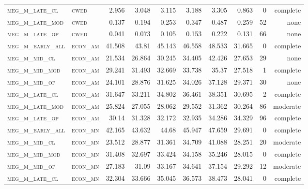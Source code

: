 \begin{landscape}
\begin{center}
\begin{footnotesize}
\begin{longtable}{llrrrrr|rrr}
\textsc{meg\_m\_late\_cl  } & \textsc{cwed      }   & 2.956    & 3.048    & 3.115    & 3.188    & 3.305    & 0.863    & 0   & complete \\
\textsc{meg\_m\_late\_mod } & \textsc{cwed      }   & 0.137    & 0.194    & 0.253    & 0.347    & 0.487    & 0.259    & 52  & none     \\
\textsc{meg\_m\_late\_op  } & \textsc{cwed      }   & 0.041    & 0.073    & 0.105    & 0.153    & 0.222    & 0.131    & 66  & none     \\
\textsc{meg\_m\_early\_all} & \textsc{econ\_am  }   & 41.508   & 43.81    & 45.143   & 46.558   & 48.533   & 31.665   & 0   & complete \\
\textsc{meg\_m\_mid\_cl   } & \textsc{econ\_am  }   & 21.534   & 26.864   & 30.245   & 34.405   & 42.426   & 27.653   & 29  & none     \\
\textsc{meg\_m\_mid\_mod  } & \textsc{econ\_am  }   & 29.241   & 31.493   & 32.669   & 33.738   & 35.37    & 27.518   & 1   & complete \\
\textsc{meg\_m\_mid\_op   } & \textsc{econ\_am  }   & 24.101   & 28.876   & 31.625   & 34.026   & 37.128   & 29.371   & 30  & none     \\
\textsc{meg\_m\_late\_cl  } & \textsc{econ\_am  }   & 31.647   & 33.211   & 34.802   & 36.461   & 38.351   & 30.695   & 2   & complete \\
\textsc{meg\_m\_late\_mod } & \textsc{econ\_am  }   & 25.824   & 27.055   & 28.062   & 29.552   & 31.362   & 30.264   & 86  & moderate \\
\textsc{meg\_m\_late\_op  } & \textsc{econ\_am  }   & 30.14    & 31.328   & 32.172   & 32.935   & 34.286   & 34.329   & 96  & complete \\
\textsc{meg\_m\_early\_all} & \textsc{econ\_mn  }   & 42.165   & 43.632   & 44.68    & 45.947   & 47.659   & 29.691   & 0   & complete \\
\textsc{meg\_m\_mid\_cl   } & \textsc{econ\_mn  }   & 23.512   & 28.877   & 31.361   & 34.709   & 41.088   & 28.251   & 20  & moderate \\
\textsc{meg\_m\_mid\_mod  } & \textsc{econ\_mn  }   & 31.408   & 32.697   & 33.424   & 34.158   & 35.246   & 28.015   & 0   & complete \\
\textsc{meg\_m\_mid\_op   } & \textsc{econ\_mn  }   & 27.183   & 31.09    & 33.167   & 34.641   & 37.154   & 29.292   & 12  & moderate \\
\textsc{meg\_m\_late\_cl  } & \textsc{econ\_mn  }   & 32.304   & 33.666   & 35.045   & 36.573   & 38.473   & 28.041   & 0   & complete \\

\end{longtable}
\end{footnotesize}
\end{center}
\end{landscape}
